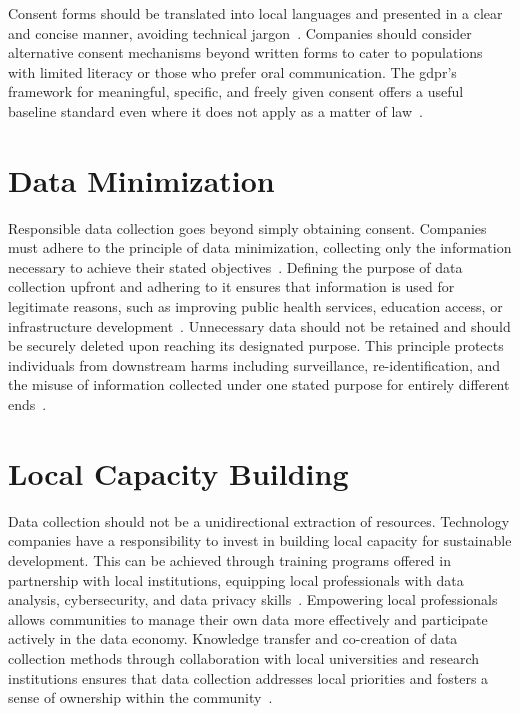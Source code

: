\documentclass[11pt,showkeys]{essay}
\begin{document}
Consent forms should be translated into local languages and presented in a clear and concise manner, avoiding technical jargon~\cite{jobin_global_2019}. Companies should consider alternative consent mechanisms beyond written forms to cater to populations with limited literacy or those who prefer oral communication. The \gls{gdpr}'s framework for meaningful, specific, and freely given consent offers a useful baseline standard even where it does not apply as a matter of law~\cite{eu_gdpr_2016}.

\section{Data Minimization}

Responsible data collection goes beyond simply obtaining consent. Companies must adhere to the principle of data minimization, collecting only the information necessary to achieve their stated objectives~\cite{aggarwal_general_2008}. Defining the purpose of data collection upfront and adhering to it ensures that information is used for legitimate reasons, such as improving public health services, education access, or infrastructure development~\cite{eu_gdpr_2016}. Unnecessary data should not be retained and should be securely deleted upon reaching its designated purpose. This principle protects individuals from downstream harms including surveillance, re-identification, and the misuse of information collected under one stated purpose for entirely different ends~\cite{ohm_broken_2009}.

\section{Local Capacity Building}

Data collection should not be a unidirectional extraction of resources. Technology companies have a responsibility to invest in building local capacity for sustainable development. This can be achieved through training programs offered in partnership with local institutions, equipping local professionals with data analysis, cybersecurity, and data privacy skills~\cite{hanna_digital_2017}. Empowering local professionals allows communities to manage their own data more effectively and participate actively in the data economy. Knowledge transfer and co-creation of data collection methods through collaboration with local universities and research institutions ensures that data collection addresses local priorities and fosters a sense of ownership within the community~\cite{runde_innovative_2022}.
\end{document}

